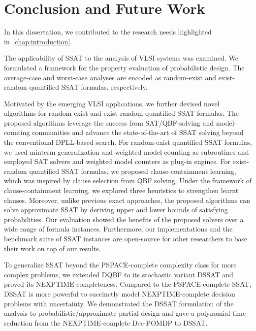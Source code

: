 \chapter{Conclusion and Future Work}
\label{chap:conclusion-future-work}

In this dissertation,
we contributed to the research needs highlighted in~\cref{chap:introduction}.

The applicability of SSAT to the analysis of VLSI systems was examined.
We formulated a framework for the property evaluation of probabilistic design.
The average-case and worst-case analyses are encoded
as random-exist and exist-random quantified SSAT formulas, respectively.

Motivated by the emerging VLSI applications,
we further devised novel algorithms for random-exist and exist-random quantified SSAT formulas.
The proposed algorithms leverage the success from SAT/QBF-solving and model-counting communities
and advance the state-of-the-art of SSAT solving beyond the conventional DPLL-based search.
For random-exist quantified SSAT formulas,
we used minterm generalization and weighted model counting as subroutines
and employed SAT solvers and weighted model counters as plug-in engines.
For exist-random quantified SSAT formulas,
we proposed clause-containment learning,
which was inspired by clause selection from QBF solving.
Under the framework of clause-containment learning,
we explored three heuristics to strengthen learnt clauses.
Moreover, unlike previous exact approaches,
the proposed algorithms can solve approximate SSAT by deriving upper and lower bounds of satisfying probabilities.
Our evaluation showed the benefits of the proposed solvers over a wide range of formula instances.
Furthermore, our implementations and the benchmark suite of SSAT instances are open-source
for other researchers to base their work on top of our results.

To generalize SSAT beyond the PSPACE-complete complexity class for more complex problems,
we extended DQBF to its stochastic variant DSSAT and proved its NEXPTIME-completeness.
Compared to the PSPACE-complete SSAT,
DSSAT is more powerful to succinctly model NEXPTIME-complete decision problems with uncertainty.
We demonstrated the DSSAT formulation of the analysis to probabilistic/approximate partial design
and gave a polynomial-time reduction from the NEXPTIME-complete Dec-POMDP to DSSAT.

